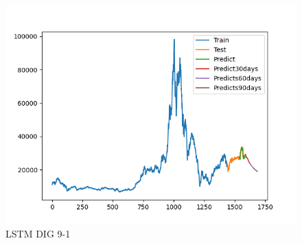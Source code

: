 \documentclass[conference]{IEEEtran}
\begin{document}
\begin{figure}[htbp]
\begin{minipage}{0.23\textwidth}
    \label{fig:nvl_histogram}
    \end{minipage}
    \begin{minipage}{0.23\textwidth}
    \centering
    \includegraphics[width=1\textwidth]{experiment/ltsm/Team4_LSTM_DIG_9_1.png}
    \caption{LSTM DIG 9-1}
    \label{fig:nvl_histogram}
    \end{minipage}

    \vspace{0.5cm} %


\end{figure}
\end{document}

